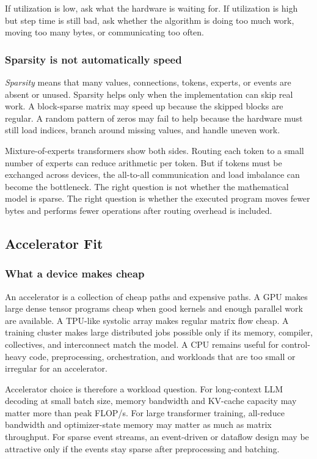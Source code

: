 If utilization is low, ask what the hardware is waiting for. If utilization is high but step time is still bad, ask whether the algorithm is doing too much work, moving too many bytes, or communicating too often.

\subsubsection{Sparsity is not automatically speed}

\emph{Sparsity} means that many values, connections, tokens, experts, or events are absent or unused. Sparsity helps only when the implementation can skip real work. A block-sparse matrix may speed up because the skipped blocks are regular. A random pattern of zeros may fail to help because the hardware must still load indices, branch around missing values, and handle uneven work.

Mixture-of-experts transformers show both sides. Routing each token to a small number of experts can reduce arithmetic per token. But if tokens must be exchanged across devices, the all-to-all communication and load imbalance can become the bottleneck. The right question is not whether the mathematical model is sparse. The right question is whether the executed program moves fewer bytes and performs fewer operations after routing overhead is included.

\subsection{Accelerator Fit}

\subsubsection{What a device makes cheap}

An accelerator is a collection of cheap paths and expensive paths. A GPU makes large dense tensor programs cheap when good kernels and enough parallel work are available. A TPU-like systolic array makes regular matrix flow cheap. A training cluster makes large distributed jobs possible only if its memory, compiler, collectives, and interconnect match the model. A CPU remains useful for control-heavy code, preprocessing, orchestration, and workloads that are too small or irregular for an accelerator.

Accelerator choice is therefore a workload question. For long-context LLM decoding at small batch size, memory bandwidth and KV-cache capacity may matter more than peak FLOP/s. For large transformer training, all-reduce bandwidth and optimizer-state memory may matter as much as matrix throughput. For sparse event streams, an event-driven or dataflow design may be attractive only if the events stay sparse after preprocessing and batching.

